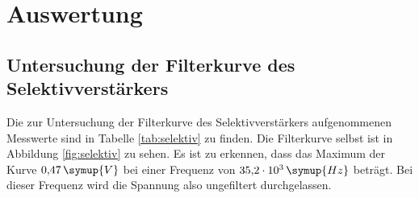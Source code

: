 \newpage
\section{Auswertung}

\subsection{Untersuchung der Filterkurve des Selektivverstärkers}
Die zur Untersuchung der Filterkurve des Selektivverstärkers aufgenommenen Messwerte sind in Tabelle \ref{tab:selektiv} zu finden. Die Filterkurve selbst ist in Abbildung \ref{fig:selektiv} zu sehen.
Es ist zu erkennen, dass das Maximum der Kurve $0{,}47\,\symup{V}$ bei einer Frequenz von $35{,}2\cdot10^{3}\,\symup{Hz}$ beträgt. Bei dieser Frequenz wird die Spannung also ungefiltert durchgelassen.

